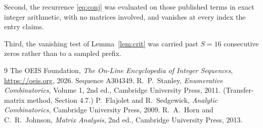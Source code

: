 \documentclass[11pt,a4paper]{article}
\theoremstyle{plain}
\theoremstyle{definition}
\begin{document}
Second, the recurrence \eqref{eq:conj} was evaluated on those published terms in exact
integer arithmetic, with no matrices involved, and vanishes at every index the entry claims.

Third, the vanishing test of Lemma~\ref{lem:crit} was carried past $S=16$ consecutive
zeros rather than to a sampled prefix.

\begin{thebibliography}{9}
 The OEIS Foundation, \emph{The On-Line Encyclopedia of Integer
Sequences}, \url{https://oeis.org}, 2026. Sequence A304349.
 R.~P.~Stanley, \emph{Enumerative Combinatorics}, Volume 1, 2nd ed.,
Cambridge University Press, 2011. (Transfer-matrix method, Section 4.7.)
 P.~Flajolet and R.~Sedgewick, \emph{Analytic Combinatorics}, Cambridge
University Press, 2009.
 R.~A.~Horn and C.~R.~Johnson, \emph{Matrix Analysis}, 2nd ed., Cambridge
University Press, 2013.
\end{thebibliography}
\end{document}
